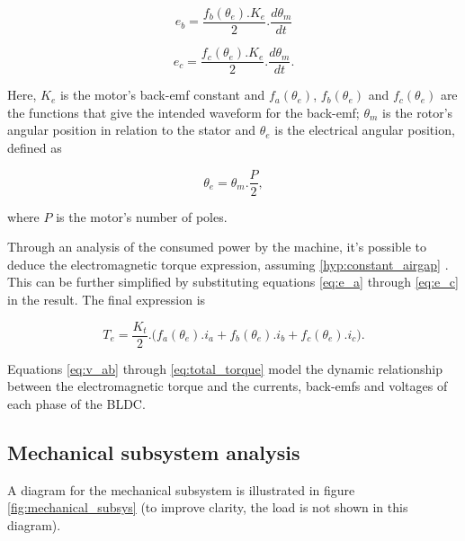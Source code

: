\documentclass{article}
\begin{document}
    \begin{equation}
        e_b = \frac{f_b(\theta_e).K_e}{2}.\frac{d\theta_m}{dt}
        \label{eq:e_b}
    \end{equation}

    \begin{equation}
        e_c = \frac{f_c(\theta_e).K_e}{2}.\frac{d\theta_m}{dt}.
        \label{eq:e_c}
    \end{equation}

    Here, $K_e$ is the motor's back-emf constant and $f_a(\theta_e)$, $f_b(\theta_e)$ and $f_c(\theta_e)$ are the functions that give the intended waveform for the back-emf; $\theta_m$ is the rotor's angular position in relation to the stator and $\theta_e$ is the electrical angular position, defined as

    \begin{equation}
        \theta_e = \theta_m.\frac{P}{2},
    \end{equation}

    where $P$ is the motor's number of poles.

    Through an analysis of the consumed power by the machine, it's possible to deduce the electromagnetic torque expression, assuming \ref{hyp:constant_airgap} \cite[p. 459]{krishnan}. This can be further simplified by substituting equations \ref{eq:e_a} through \ref{eq:e_c} in the result. The final expression is

    \begin{equation}
        T_e = \frac{K_t}{2}.\Big(f_a(\theta_e).i_a + f_b(\theta_e).i_b + f_c(\theta_e).i_c\Big).
        \label{eq:total_torque}
    \end{equation}

    Equations \ref{eq:v_ab} through \ref{eq:total_torque} model the dynamic relationship between the electromagnetic torque and the currents, back-emfs and voltages of each phase of the BLDC.




    \subsection{Mechanical subsystem analysis}

    A diagram for the mechanical subsystem is illustrated in figure \ref{fig:mechanical_subsys} (to improve clarity, the load is not shown in this diagram).
\end{document}
